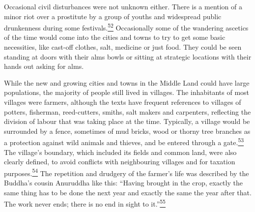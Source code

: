 Occasional civil disturbances were not unknown either. There is a
mention of a minor riot over a prostitute by a group of youths and
widespread public drunkenness during some
festivals.\label{footprints_split_006.html_fnref52}\hyperref[footprints_split_024.htmlux5cux23fn52]{\textsuperscript{52}}
Occasionally some of the wandering ascetics of the time would come into
the cities and towns to try to get some basic necessities, like cast-off
clothes, salt, medicine or just food. They could be seen standing at
doors with their alms bowls or sitting at strategic locations with their
hands out asking for alms.

While the new and growing cities and towns in the Middle Land could have
large populations, the majority of people still lived in villages. The
inhabitants of most villages were farmers, although the texts have
frequent references to villages of potters, fisherman, reed-cutters,
smiths, salt makers and carpenters, reflecting the division of labour
that was taking place at the time. Typically, a village would be
surrounded by a fence, sometimes of mud bricks, wood or thorny tree
branches as a protection against wild animals and thieves, and be
entered through a
gate.\label{footprints_split_006.html_fnref53}\hyperref[footprints_split_024.htmlux5cux23fn53]{\textsuperscript{53}}
The village's boundary, which included its fields and common land, were
also clearly defined, to avoid conflicts with neighbouring villages and
for taxation
purposes.\label{footprints_split_006.html_fnref54}\hyperref[footprints_split_024.htmlux5cux23fn54]{\textsuperscript{54}}
The repetition and drudgery of the farmer's life was described by the
Buddha's cousin Anuruddha like this: ``Having brought in the crop,
exactly the same thing has to be done the next year and exactly the same
the year after that. The work never ends; there is no end in sight to
it.''\label{footprints_split_006.html_fnref55}\hyperref[footprints_split_024.htmlux5cux23fn55]{\textsuperscript{55}}

